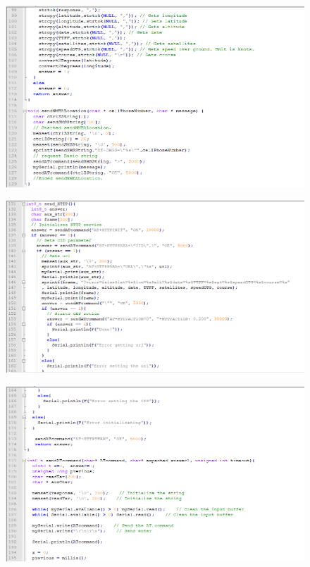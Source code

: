 \begin{enumerate}
\begin{figure}[!h]
	\end{figure}
\newpage
	\begin{figure}[!h]
		\centerline{\includegraphics[width=1.1\textwidth]{code4}}
	\end{figure}
	\begin{figure}[!h]
		\centerline{\includegraphics[width=1.1\textwidth]{code5}}
	\end{figure}
\newpage
	\begin{figure}[!h]
		\centerline{\includegraphics[width=1.1\textwidth]{code6}}

\end{figure}
\end{enumerate}

